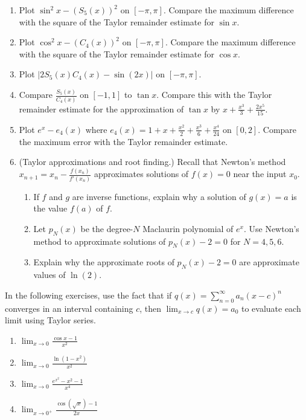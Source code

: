 \documentclass{exercises}
\begin{document}
\begin{enumerate}[resume]
\item \techrequired Plot $\sin^{2}x-{(S_{5}(x))}^{2}$ on $[-\pi,\pi]$. Compare the maximum difference with the square of the Taylor remainder estimate for $\sin x$.
\item \techrequired Plot $\cos^{2}x-{(C_{4}(x))}^{2}$ on $[-\pi,\pi]$. Compare the maximum difference with the square of the Taylor remainder estimate for $\cos x$.
\item \techrequired Plot $|2S_{5}(x)C_{4}(x)-\sin(2x)|$ on $[-\pi,\pi]$.
\item \techrequired Compare $\frac{S_{5}(x)}{C_{4}(x)}$ on $[-1,1]$ to $\tan x$. Compare this with the Taylor remainder estimate for the approximation of $\tan x$ by $x+\frac{x^{3}}{3}+\frac{2x^{5}}{15}$.
\item \techrequired Plot $e^{x}-e_{4}(x)$ where $e_{4}(x)=1+x+\frac{x^{2}}{2}+\frac{x^{3}}{6}+\frac{x^{4}}{24}$ on $[0,2]$. Compare the maximum error with the Taylor remainder estimate.
\item (Taylor approximations and root finding.) Recall that Newton's method $x_{n+1}=x_{n}-\frac{f(x_{n})}{f'(x_{n})}$ approximates solutions of $f(x)=0$ near the input $x_{0}$.
\begin{enumerate}[label=(\alph*)]
  \item If $f$ and $g$ are inverse functions, explain why a solution of $g(x)=a$ is the value $f(a)$ of $f$.
  \item Let $p_{N}(x)$ be the degree-$N$ Maclaurin polynomial of $e^{x}$. Use Newton's method to approximate solutions of $p_{N}(x)-2=0$ for $N=4,5,6$.
  \item Explain why the approximate roots of $p_{N}(x)-2=0$ are approximate values of $\ln (2)$.
\end{enumerate}
\end{enumerate}

In the following exercises, use the fact that if $q(x)=\sum_{n=0}^{\infty}a_{n}(x-c)^{n}$ converges in an interval containing $c$, then $\lim_{x\to c}q(x)=a_{0}$ to evaluate each limit using Taylor series.

\begin{enumerate}[resume]
\item $\lim_{x\to0}\frac{\cos x-1}{x^{2}}$
\item $\lim_{x\to0}\frac{\ln (1-x^{2})}{x^{2}}$
\item $\lim_{x\to0}\frac{e^{x^{2}}-x^{2}-1}{x^{4}}$
\item $\lim_{x\to0^{+}}\frac{\cos(\sqrt{x})-1}{2x}$
\end{enumerate}
\end{document}
